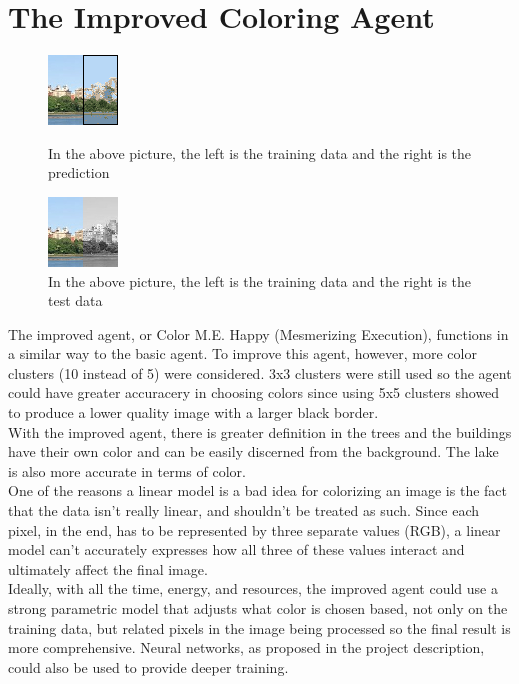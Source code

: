\documentclass[12pt]{report}
\begin{document}
\section*{The Improved Coloring Agent}
\begin{figure}
\includegraphics[width=.5\textwidth]{Improved Agent Prediction}
\caption{In the above picture, the left is the training data and the right is the prediction}
\includegraphics[width=.5\textwidth]{Test Image}
\caption{In the above picture, the left is the training data and the right is the test data}
\end{figure}
The improved agent, or Color M.E. Happy (Mesmerizing Execution), functions in a similar way to the basic agent. To improve this agent, however, more color clusters (10 instead of 5) were considered. 3x3 clusters were still used so the agent could have greater accuracery in choosing colors since using 5x5 clusters showed to produce a lower quality image with a larger black border.\\
With the improved agent, there is greater definition in the trees and the buildings have their own color and can be easily discerned from the background. The lake is also more accurate in terms of color.\\
One of the reasons a linear model is a bad idea for colorizing an image is the fact that the data isn't really linear, and shouldn't be treated as such. Since each pixel, in the end, has to be represented by three separate values (RGB), a linear model can't accurately expresses how all three of these values interact and ultimately affect the final image.\\
Ideally, with all the time, energy, and resources, the improved agent could use a strong parametric model that adjusts what color is chosen based, not only on the training data, but related pixels in the image being processed so the final result is more comprehensive. Neural networks, as proposed in the project description, could also be used to provide deeper training.
\end{document}
